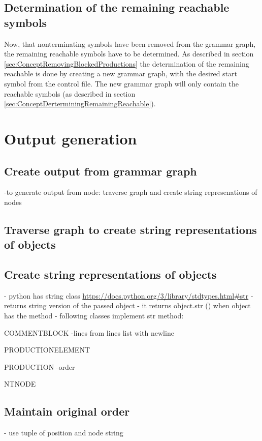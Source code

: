 \subsection{Determination of the remaining reachable symbols}
Now, that nonterminating symbols have been removed from the grammar graph, the remaining reachable symbols have to be determined.
As described in section \ref{sec:ConceptRemovingBlockedProductions} the determination of the remaining reachable is done by creating a new grammar graph, with the desired start symbol from the control file.
The new grammar graph will only contain the reachable symbols (as described in section \ref{sec:ConceptDerterminingRemainingReachable}). 
\section{Output generation}\label{sec:ImplementationOutputGeneration}

\subsection{Create output from grammar graph}\label{sec:ImplementationOutputGrammarGraph}
-to generate output from node:
traverse graph and create string represenations of nodes
\subsection{Traverse graph to create string representations of objects}\label{sec:ImpolementationOutputGrammarGraphTraverse}

\subsection{Create string representations of objects}\label{sec:ImplementationOutputGrammarGraphStringRepresentations}

- python has string class \url{https://docs.python.org/3/library/stdtypes.html#str}
- returns string version of the passed object
- it returns object.\textunderscore \textunderscore str \textunderscore \textunderscore () when object has the method
- following classes implement str method:

COMMENT\textunderscore  BLOCK
-lines from lines list with newline

PRODUCTION\textunderscore ELEMENT

PRODUCTION
-order

NTNODE

\subsection{Maintain original order}\label{sec:ImplementationOutputGrammarGraphMaintainOrder}
- use tuple of position and node string


